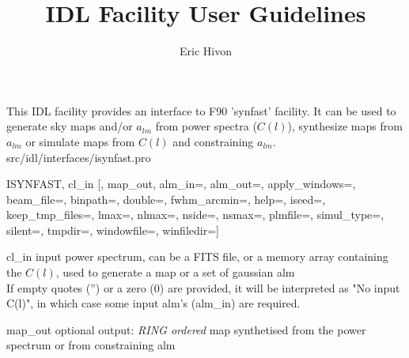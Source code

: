 
\sloppy

\title{\healpix IDL Facility User Guidelines}
 \section[isynfast]{ }
\label{idl:isynfast}
\author{Eric Hivon}

\begin{facility}
{This IDL facility provides an interface to F90 'synfast' facility. It can be
used to generate sky maps and/or $a_{lm}$ from power spectra ($C(l)$), synthesize maps from
$a_{lm}$ or simulate maps from $C(l)$ and constraining $a_{lm}$.}
{src/idl/interfaces/isynfast.pro}
\end{facility}

\begin{IDLformat}
{ISYNFAST, cl\_in [, map\_out,
      alm\_in=,  alm\_out=, apply\_windows=, beam\_file=, binpath=, double=, fwhm\_arcmin=, help=,
      iseed=, keep\_tmp\_files=, lmax=, nlmax=, nside=, nsmax=, plmfile=,
      simul\_type=, silent=, tmpdir=, windowfile=, winfiledir=]}
\end{IDLformat}

\begin{qualifiers}
  \begin{qulist}{} %
   \item[cl\_in] input power spectrum, can be a FITS file, or a memory array containing the
        $C(l)$, used to generate a map or a set of gaussian alm \\
   If empty quotes ('') or a zero (0) are provided, it will be interpreted as "No input C(l)", in
   which case some input alm's (alm\_in) are required.
    \item[map\_out] optional output: {\em RING ordered} map synthetised from the power spectrum or from constraining alm
  \end{qulist}
\end{qualifiers}

